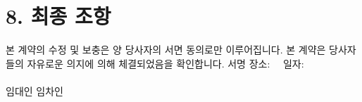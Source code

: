 \section*{8. 최종 조항}
본 계약의 수정 및 보충은 양 당사자의 서면 동의로만 이루어집니다. 본 계약은 당사자들의 자유로운 의지에 의해 체결되었음을 확인합니다.
\vspace{2cm}
서명 장소: \ContractPlace \ \ 일자: \ContractDate \hfill \underline{\hspace{5cm}} \\ \vspace{1.5cm}
\underline{\hspace{5cm}} \hfill \underline{\hspace{5cm}} \\ \vspace{0.2cm} 임대인 \hfill 임차인 \\
